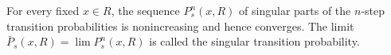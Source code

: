 For every fixed $x \in R$, the sequence $P_s^n(x, R)$ of singular parts of the $n$-step transition probabilities is nonincreasing and hence converges. The limit $\bar{P}_s(x, R) = \lim P_s^n(x, R)$ is called the singular transition probability.
